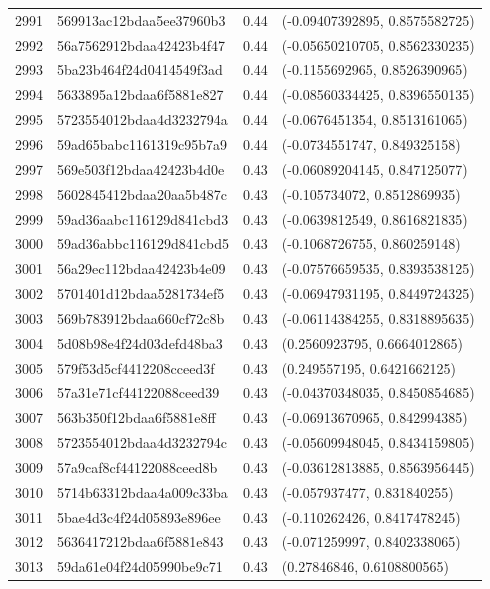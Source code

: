 \begin{table}[ht]
\begin{tabular}{rlrl}
  2991 & 569913ac12bdaa5ee37960b3 & 0.44 & (-0.09407392895, 0.8575582725) \\ 
  2992 & 56a7562912bdaa42423b4f47 & 0.44 & (-0.05650210705, 0.8562330235) \\ 
  2993 & 5ba23b464f24d0414549f3ad & 0.44 & (-0.1155692965, 0.8526390965) \\ 
  2994 & 5633895a12bdaa6f5881e827 & 0.44 & (-0.08560334425, 0.8396550135) \\ 
  2995 & 5723554012bdaa4d3232794a & 0.44 & (-0.0676451354, 0.8513161065) \\ 
  2996 & 59ad65babc1161319c95b7a9 & 0.44 & (-0.0734551747, 0.849325158) \\ 
  2997 & 569e503f12bdaa42423b4d0e & 0.43 & (-0.06089204145, 0.847125077) \\ 
  2998 & 5602845412bdaa20aa5b487c & 0.43 & (-0.105734072, 0.8512869935) \\ 
  2999 & 59ad36aabc116129d841cbd3 & 0.43 & (-0.0639812549, 0.8616821835) \\ 
  3000 & 59ad36abbc116129d841cbd5 & 0.43 & (-0.1068726755, 0.860259148) \\ 
  3001 & 56a29ec112bdaa42423b4e09 & 0.43 & (-0.07576659535, 0.8393538125) \\ 
  3002 & 5701401d12bdaa5281734ef5 & 0.43 & (-0.06947931195, 0.8449724325) \\ 
  3003 & 569b783912bdaa660cf72c8b & 0.43 & (-0.06114384255, 0.8318895635) \\ 
  3004 & 5d08b98e4f24d03defd48ba3 & 0.43 & (0.2560923795, 0.6664012865) \\ 
  3005 & 579f53d5cf4412208cceed3f & 0.43 & (0.249557195, 0.6421662125) \\ 
  3006 & 57a31e71cf44122088ceed39 & 0.43 & (-0.04370348035, 0.8450854685) \\ 
  3007 & 563b350f12bdaa6f5881e8ff & 0.43 & (-0.06913670965, 0.842994385) \\ 
  3008 & 5723554012bdaa4d3232794c & 0.43 & (-0.05609948045, 0.8434159805) \\ 
  3009 & 57a9caf8cf44122088ceed8b & 0.43 & (-0.03612813885, 0.8563956445) \\ 
  3010 & 5714b63312bdaa4a009c33ba & 0.43 & (-0.057937477, 0.831840255) \\ 
  3011 & 5bae4d3c4f24d05893e896ee & 0.43 & (-0.110262426, 0.8417478245) \\ 
  3012 & 5636417212bdaa6f5881e843 & 0.43 & (-0.071259997, 0.8402338065) \\ 
  3013 & 59da61e04f24d05990be9c71 & 0.43 & (0.27846846, 0.6108800565) \\ 

\end{tabular}
\end{table}

